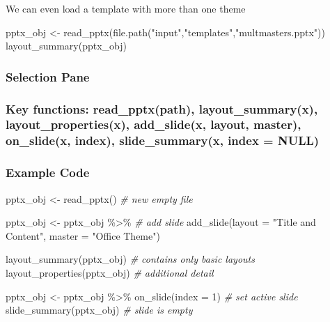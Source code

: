 \documentclass[
]{book}
\newenvironment{Shaded}{\begin{snugshade}}{\end{snugshade}}
\newcommand{\AttributeTok}[1]{\textcolor[rgb]{0.77,0.63,0.00}{#1}}
\newcommand{\CommentTok}[1]{\textcolor[rgb]{0.56,0.35,0.01}{\textit{#1}}}
\newcommand{\DecValTok}[1]{\textcolor[rgb]{0.00,0.00,0.81}{#1}}
\newcommand{\FunctionTok}[1]{\textcolor[rgb]{0.00,0.00,0.00}{#1}}
\newcommand{\NormalTok}[1]{#1}
\newcommand{\OtherTok}[1]{\textcolor[rgb]{0.56,0.35,0.01}{#1}}
\newcommand{\SpecialCharTok}[1]{\textcolor[rgb]{0.00,0.00,0.00}{#1}}
\newcommand{\StringTok}[1]{\textcolor[rgb]{0.31,0.60,0.02}{#1}}
\begin{document}
We can even load a template with more than one theme

\begin{Shaded}
\begin{Highlighting}[]
\NormalTok{pptx\_obj }\OtherTok{\textless{}{-}} \FunctionTok{read\_pptx}\NormalTok{(}\FunctionTok{file.path}\NormalTok{(}\StringTok{"input"}\NormalTok{,}\StringTok{"templates"}\NormalTok{,}\StringTok{"multmasters.pptx"}\NormalTok{))}
\FunctionTok{layout\_summary}\NormalTok{(pptx\_obj)}
\end{Highlighting}
\end{Shaded}

\hypertarget{selection-pane}{%
\subsubsection{Selection Pane}\label{selection-pane}}

\hypertarget{key-functions-read_pptxpath-layout_summaryx-layout_propertiesx-add_slidex-layout-master-on_slidex-index-slide_summaryx-index-null}{%
\subsubsection{Key functions: read\_pptx(path), layout\_summary(x), layout\_properties(x), add\_slide(x, layout, master), on\_slide(x, index), slide\_summary(x, index = NULL)}\label{key-functions-read_pptxpath-layout_summaryx-layout_propertiesx-add_slidex-layout-master-on_slidex-index-slide_summaryx-index-null}}

\hypertarget{example-code}{%
\subsubsection{Example Code}\label{example-code}}

\begin{Shaded}
\begin{Highlighting}[]
\NormalTok{pptx\_obj }\OtherTok{\textless{}{-}} \FunctionTok{read\_pptx}\NormalTok{() }\CommentTok{\# new empty file}

\NormalTok{pptx\_obj }\OtherTok{\textless{}{-}}\NormalTok{ pptx\_obj }\SpecialCharTok{\%\textgreater{}\%} \CommentTok{\# add slide}
  \FunctionTok{add\_slide}\NormalTok{(}\AttributeTok{layout =} \StringTok{"Title and Content"}\NormalTok{, }\AttributeTok{master =} \StringTok{"Office Theme"}\NormalTok{)}

\FunctionTok{layout\_summary}\NormalTok{(pptx\_obj) }\CommentTok{\# contains only basic layouts}
\FunctionTok{layout\_properties}\NormalTok{(pptx\_obj) }\CommentTok{\# additional detail}

\NormalTok{pptx\_obj }\OtherTok{\textless{}{-}}\NormalTok{ pptx\_obj }\SpecialCharTok{\%\textgreater{}\%} 
  \FunctionTok{on\_slide}\NormalTok{(}\AttributeTok{index =} \DecValTok{1}\NormalTok{) }\CommentTok{\# set active slide}
\FunctionTok{slide\_summary}\NormalTok{(pptx\_obj) }\CommentTok{\# slide is empty}
\end{Highlighting}
\end{Shaded}
\end{document}
